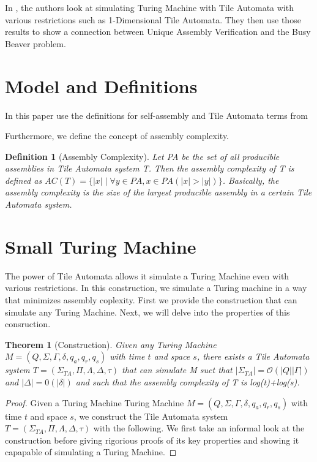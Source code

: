 \documentclass{article}
\newtheorem{definition}{Definition}[section]
\newtheorem{theorem}{Theorem}
\begin{document}
In \cite{caballero2021verification}, the authors look at simulating Turing Machine with Tile
Automata with various restrictions such as 1-Dimensional Tile Automata.  They then use those
results to show a connection between Unique Assembly Verification and the Busy Beaver problem.


\section{Model and Definitions}

In this paper use the definitions for self-assembly and Tile Automata terms from
\cite{chalk2018freezing}

Furthermore, we define the concept of assembly complexity.
\begin{definition}[Assembly Complexity]
  Let PA be the set of all producible assemblies in Tile Automata system T.  Then the assembly
  complexity of T is defined as $AC(T) = \{|x| \mid \forall y \in PA, x \in PA(|x| > |y|)\}$.
  Basically, the assembly complexity is
  the size of the largest producible assembly in a certain Tile Automata system.

  
\end{definition}

\section{Small Turing Machine}

The power of Tile Automata allows it simulate a Turing Machine even with various restrictions.
In this construction, we simulate a Turing machine in a way that minimizes assembly coplexity.
First we provide the construction that can simulate any Turing Machine.  Next, we will delve into
the properties of this consruction.

\begin{theorem}[Construction]
  Given any Turing Machine $M = (Q, \Sigma, \Gamma, \delta, q_a, q_r, q_s)$ with time $t$ and space $s$, there exists a Tile Automata system $T = (\Sigma_{TA}, \Pi, \Lambda, \Delta, \tau)$ that can simulate M suct that $|\Sigma_{TA}| = \mathcal{O}(|Q||\Gamma|)$ and $|\Delta| = \mathcal{0}(|\delta|)$
  and such that the assembly complexity of T is log(t)+log(s).


\end{theorem}

\begin{proof}
  Given a Turing Machine Turing Machine $M = (Q, \Sigma, \Gamma, \delta, q_a, q_r, q_s)$ with time $t$ and space $s$, we construct the Tile Automata system $T = (\Sigma_{TA}, \Pi, \Lambda, \Delta, \tau)$ with the following.  We first take an informal look at the construction before giving rigorious proofs of its key properties and showing it capapable of simulating a Turing Machine.
\end{proof}
\end{document}
